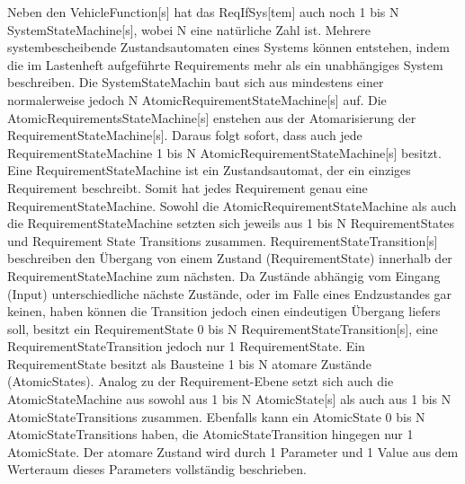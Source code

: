 Neben den VehicleFunction[s] hat das ReqIfSys[tem] auch noch 1 bis N SystemStateMachine[s], wobei N eine natürliche Zahl ist. Mehrere systembescheibende Zustandsautomaten eines Systems können entstehen, indem die im Lastenheft aufgeführte Requirements mehr als ein unabhängiges System beschreiben. Die SystemStateMachin baut sich aus mindestens einer normalerweise jedoch N AtomicRequirementStateMachine[s] auf. Die AtomicRequirementsStateMachine[s] enstehen aus der Atomarisierung der RequirementStateMachine[s]. Daraus folgt sofort, dass auch jede RequirementStateMachine 1 bis N AtomicRequirementStateMachine[s] besitzt. Eine RequirementStateMachine ist ein Zustandsautomat, der ein einziges Requirement beschreibt. Somit hat jedes Requirement genau eine RequirementStateMachine. Sowohl die AtomicRequirementStateMachine als auch die RequirementStateMachine setzten sich jeweils aus 1 bis N RequirementStates und Requirement State Transitions zusammen. RequirementStateTransition[s] beschreiben den Übergang  von einem Zustand (RequirementState) innerhalb der RequirementStateMachine zum nächsten. Da Zustände abhängig vom Eingang (Input) unterschiedliche nächste Zustände, oder im Falle eines Endzustandes gar keinen, haben können die Transition jedoch einen eindeutigen Übergang liefers soll, besitzt ein RequirementState 0 bis N RequirementStateTransition[s], eine RequirementStateTransition jedoch nur 1 RequirementState. Ein RequirementState besitzt als Bausteine 1 bis N atomare Zustände (AtomicStates). Analog zu der Requirement-Ebene setzt sich auch die AtomicStateMachine aus sowohl aus 1 bis N AtomicState[s] als auch aus 1 bis N AtomicStateTransitions zusammen. Ebenfalls kann ein AtomicState 0 bis N AtomicStateTransitions haben, die AtomicStateTransition hingegen nur 1 AtomicState. Der atomare Zustand wird durch 1 Parameter und 1 Value aus dem Werteraum dieses Parameters vollständig beschrieben. 
